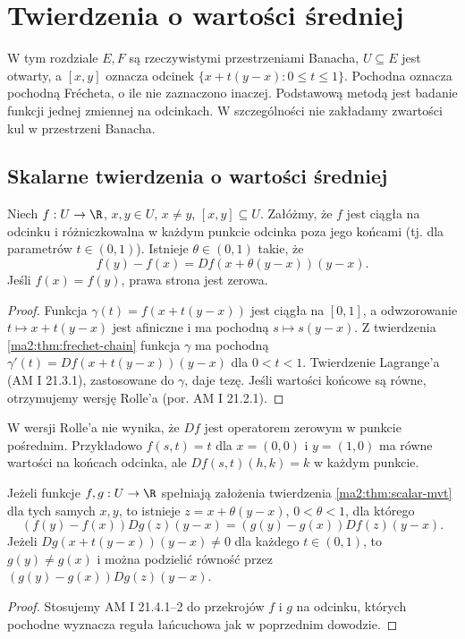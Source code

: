 \chapter{Twierdzenia o wartości średniej}
\label{ma2:ch:mean-value}

W tym rozdziale $E,F$ są rzeczywistymi przestrzeniami
Banacha, $U\subseteq E$ jest otwarty, a $[x,y]$ oznacza
odcinek $\{x+t(y-x):0\le t\le1\}$.
Pochodna oznacza pochodną Frécheta, o ile nie
zaznaczono inaczej. Podstawową metodą jest badanie
funkcji jednej zmiennej na odcinkach. W szczególności
nie zakładamy zwartości kul w przestrzeni Banacha.

\section{Skalarne twierdzenia o wartości średniej}

\begin{twierdzenie}
\label{ma2:thm:scalar-mvt}
Niech $f:U\to\R$, $x,y\in U$, $x\ne y$, $[x,y]\subseteq U$.
Załóżmy, że $f$ jest ciągła na odcinku i różniczkowalna
w każdym punkcie odcinka poza jego końcami
(tj. dla parametrów $t\in(0,1)$). Istnieje $\theta\in(0,1)$ takie, że
\[
 f(y)-f(x)=Df(x+\theta(y-x))(y-x).
\]
Jeśli $f(x)=f(y)$, prawa strona jest zerowa.
\end{twierdzenie}
\begin{proof}
Funkcja $\gamma(t)=f(x+t(y-x))$ jest ciągła na $[0,1]$,
a odwzorowanie $t\mapsto x+t(y-x)$ jest afiniczne
i ma pochodną $s\mapsto s(y-x)$. Z twierdzenia
\ref{ma2:thm:frechet-chain} funkcja $\gamma$ ma
pochodną $\gamma'(t)=Df(x+t(y-x))(y-x)$ dla $0<t<1$.
Twierdzenie Lagrange'a (AM I 21.3.1), zastosowane do
$\gamma$, daje tezę. Jeśli wartości końcowe są równe,
otrzymujemy wersję Rolle'a (por. AM I 21.2.1).
\end{proof}

W wersji Rolle'a nie wynika, że $Df$ jest operatorem
zerowym w punkcie pośrednim. Przykładowo
$f(s,t)=t$ dla $x=(0,0)$ i $y=(1,0)$ ma równe
wartości na końcach odcinka, ale $Df(s,t)(h,k)=k$
w każdym punkcie.

\begin{wniosek}
\label{ma2:cor:scalar-cauchy}
Jeżeli funkcje $f,g:U\to\R$ spełniają założenia
twierdzenia \ref{ma2:thm:scalar-mvt} dla tych samych
$x,y$, to istnieje $z=x+\theta(y-x)$, $0<\theta<1$,
dla którego
\[
 (f(y)-f(x))Dg(z)(y-x)
 =(g(y)-g(x))Df(z)(y-x).
\]
Jeżeli $Dg(x+t(y-x))(y-x)\ne0$ dla każdego $t\in(0,1)$,
to $g(y)\ne g(x)$ i można podzielić równość przez
$(g(y)-g(x))Dg(z)(y-x)$.
\end{wniosek}
\begin{proof}
Stosujemy AM I 21.4.1--2 do przekrojów $f$ i $g$
na odcinku, których pochodne wyznacza reguła
łańcuchowa jak w poprzednim dowodzie.
\end{proof}

